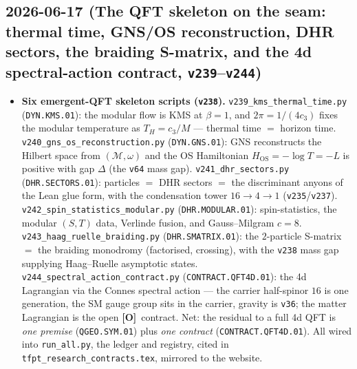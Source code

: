 \documentclass[11pt]{article}
\providecommand{\mO}{\textbf{[O]}}\providecommand{\mX}{\textbf{[X]}}
\providecommand{\vref}[1]{\texttt{#1}}
\begin{document}
\subsection*{2026-06-17 (The QFT skeleton on the seam: thermal time, GNS/OS reconstruction, DHR sectors, the braiding S-matrix, and the 4d spectral-action contract, \texttt{v239}--\texttt{v244})}
\begin{itemize}
\item \textbf{Six emergent-QFT skeleton scripts (\vref{v238}).}
  \texttt{v239\_\allowbreak kms\_\allowbreak thermal\_\allowbreak time.py} (\texttt{DYN.KMS.01}): the modular flow is KMS
  at $\beta=1$, and $2\pi=1/(4c_3)$ fixes the modular temperature as $T_H=c_3/M$ ---
  thermal time $=$ horizon time. \texttt{v240\_gns\_os\_reconstruction.py}
  (\texttt{DYN.GNS.01}): GNS reconstructs the Hilbert space from $(\mathcal M,\omega)$
  and the OS Hamiltonian $H_{\mathrm{OS}}=-\log T=-L$ is positive with gap $\Delta$
  (the \vref{v64} mass gap). \texttt{v241\_dhr\_sectors.py} (\texttt{DHR.SECTORS.01}):
  particles $=$ DHR sectors $=$ the discriminant anyons of the Lean glue form, with
  the condensation tower $16\to4\to1$ (\vref{v235}/\vref{v237}).
  \texttt{v242\_spin\_statistics\_modular.py} (\texttt{DHR.MODULAR.01}):
  spin-statistics, the modular $(S,T)$ data, Verlinde fusion, and Gauss--Milgram
  $c=8$. \texttt{v243\_haag\_ruelle\_braiding.py} (\texttt{DHR.SMATRIX.01}): the
  $2$-particle S-matrix $=$ the braiding monodromy (factorised, crossing), with the
  \vref{v238} mass gap supplying Haag--Ruelle asymptotic states.
  \texttt{v244\_spectral\_action\_contract.py} (\texttt{CONTRACT.QFT4D.01}): the 4d
  Lagrangian via the Connes spectral action --- the carrier half-spinor $16$ is one
  generation, the SM gauge group sits in the carrier, gravity is \vref{v36}; the
  matter Lagrangian is the open \mO\ contract. Net: the residual to a full 4d QFT is
  \emph{one premise} (\texttt{QGEO.SYM.01}) plus \emph{one contract}
  (\texttt{CONTRACT.QFT4D.01}). All wired into \texttt{run\_all.py}, the ledger and
  registry, cited in \texttt{tfpt\_research\_contracts.tex}, mirrored to the website.
\end{itemize}
\end{document}
